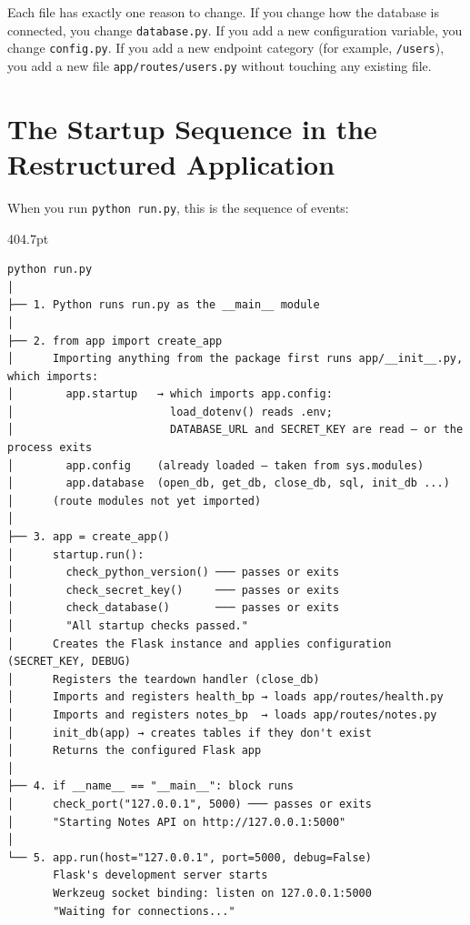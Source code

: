 Each file has exactly one reason to change. If you change how the database is connected, you change \texttt{database.py}. If you add a new configuration variable, you change \texttt{config.py}. If you add a new endpoint category (for example, \texttt{/users}), you add a new file \texttt{app/}\allowbreak{}\texttt{routes/}\allowbreak{}\texttt{users.py} without touching any existing file.

\setcounter{section}{7}
\section{The Startup Sequence in the Restructured Application}\label{15-structuring-the-application:158-the-startup-sequence-in-the-restructured-application}

When you run \texttt{python\ run.py}, this is the sequence of events:

\begin{diagrambox}[short]{404.7pt}
\begin{Verbatim}[fontsize=\fontsize{9.0}{8.55}\selectfont]
python run.py
│
├── 1. Python runs run.py as the __main__ module
│
├── 2. from app import create_app
│      Importing anything from the package first runs app/__init__.py, which imports:
│        app.startup   → which imports app.config:
│                        load_dotenv() reads .env;
│                        DATABASE_URL and SECRET_KEY are read — or the process exits
│        app.config    (already loaded — taken from sys.modules)
│        app.database  (open_db, get_db, close_db, sql, init_db ...)
│      (route modules not yet imported)
│
├── 3. app = create_app()
│      startup.run():
│        check_python_version() ─── passes or exits
│        check_secret_key()     ─── passes or exits
│        check_database()       ─── passes or exits
│        "All startup checks passed."
│      Creates the Flask instance and applies configuration (SECRET_KEY, DEBUG)
│      Registers the teardown handler (close_db)
│      Imports and registers health_bp → loads app/routes/health.py
│      Imports and registers notes_bp  → loads app/routes/notes.py
│      init_db(app) → creates tables if they don't exist
│      Returns the configured Flask app
│
├── 4. if __name__ == "__main__": block runs
│      check_port("127.0.0.1", 5000) ─── passes or exits
│      "Starting Notes API on http://127.0.0.1:5000"
│
└── 5. app.run(host="127.0.0.1", port=5000, debug=False)
       Flask's development server starts
       Werkzeug socket binding: listen on 127.0.0.1:5000
       "Waiting for connections..."
\end{Verbatim}
\end{diagrambox}

